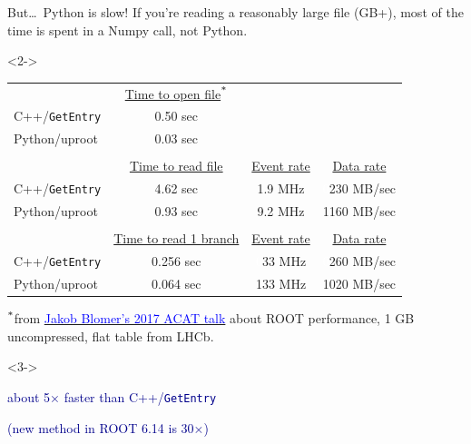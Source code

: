 \documentclass[aspectratio=169]{beamer}
\begin{document}
\begin{frame}{But\ldots\ Python is slow!}
\vspace{0.4 cm}
{\large If you're reading a reasonably large file (GB+), most of the time is spent in a Numpy call, not Python.}

\vspace{0.3 cm}
\begin{uncoverenv}<2->
\begin{tabular}{l c c c}
& \underline{Time to open file}$^{\mbox{\scriptsize *}}$ & & \\
C++/{\tt GetEntry} & 0.50 sec & & \\
Python/uproot & 0.03 sec & & \\
& & & \\
 & \underline{Time to read file} & \underline{Event rate} & \underline{Data rate} \\
C++/{\tt GetEntry} & 4.62 sec & 1.9 MHz & \textcolor{white}{0}230 MB/sec \\
Python/uproot & 0.93 sec & 9.2 MHz & 1160 MB/sec \\
& & & \\
& \underline{Time to read 1 branch} & \underline{Event rate} & \underline{Data rate} \\
C++/{\tt GetEntry} & 0.256 sec & \textcolor{white}{0}33 MHz & \textcolor{white}{0}260 MB/sec \\
Python/uproot & 0.064 sec & 133 MHz & 1020 MB/sec
\end{tabular}

\vspace{0.5 cm}
{\scriptsize $^{\mbox{\scriptsize *}}$from \href{https://indico.cern.ch/event/567550/contributions/2628878/}{\textcolor{blue}{Jakob Blomer's 2017 ACAT talk}} about ROOT performance, 1 GB uncompressed, flat table from LHCb.}
\end{uncoverenv}

\vspace{-6.6 cm}\hfill\begin{minipage}{0.3\linewidth}
\begin{uncoverenv}<3->
\begin{center}
\large
\textcolor{darkblue}{about 5$\times$ faster than C++/{\tt GetEntry}}

\vspace{0.1 cm}
\textcolor{darkblue}{(new method in ROOT 6.14 is 30$\times$)}
\end{center}
\end{uncoverenv}
\vspace{6.6 cm}
\end{minipage}
\end{frame}
\end{document}
